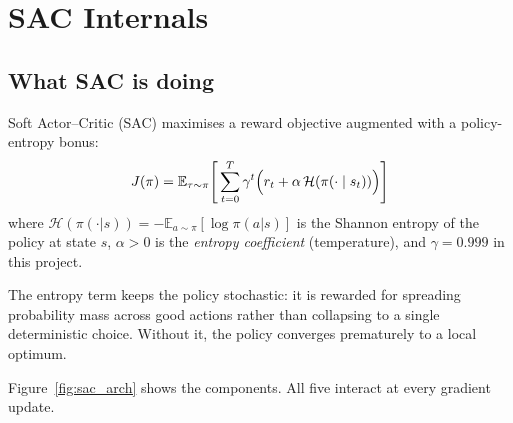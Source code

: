 \documentclass[11pt]{article}
\begin{document}
\section{SAC Internals}

\subsection*{What SAC is doing}

Soft Actor--Critic (SAC) \cite{haarnoja2018sac} maximises a reward objective
augmented with a policy-entropy bonus:
\begin{equation}
  J(\pi)
  = \mathbb{E}_{\tau \sim \pi}
    \!\left[\,
      \sum_{t=0}^{T} \gamma^t
      \Bigl(r_t + \alpha\,\mathcal{H}\!\left(\pi(\cdot \mid s_t)\right)\Bigr)
    \right]
  \label{eq:sac_obj}
\end{equation}
where $\mathcal{H}(\pi(\cdot|s)) = -\mathbb{E}_{a \sim \pi}[\log \pi(a|s)]$
is the Shannon entropy of the policy at state $s$,
$\alpha > 0$ is the \emph{entropy coefficient} (temperature),
and $\gamma = 0.999$ in this project.

The entropy term keeps the policy stochastic: it is rewarded for spreading
probability mass across good actions rather than collapsing to a single deterministic
choice.  Without it, the policy converges prematurely to a local optimum.

\medskip

Figure~\ref{fig:sac_arch} shows the components.  All five interact at every
gradient update.
\end{document}
